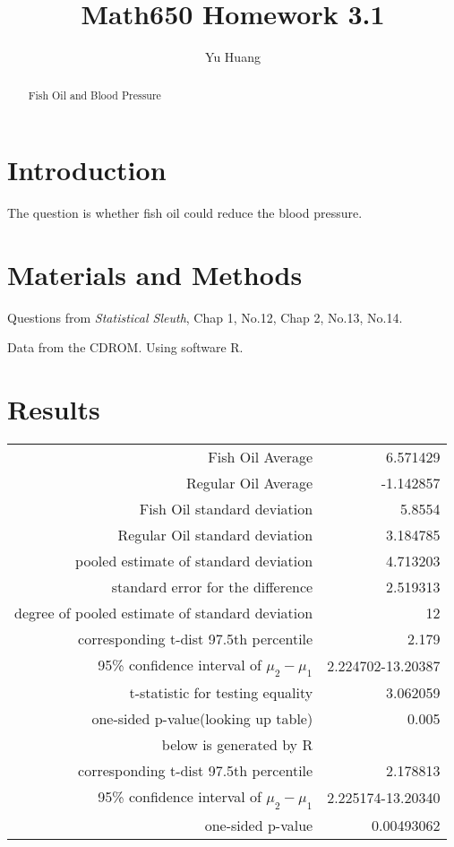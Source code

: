 \documentclass[a4paper,10pt]{article}
\title{Math650 Homework 3.1}
\author{Yu Huang}
\begin{document}
\maketitle

\begin{abstract}
Fish Oil and Blood Pressure
\end{abstract}

\section{Introduction}
The question is whether fish oil could reduce the blood pressure.

\section{Materials and Methods}
Questions from \emph{Statistical Sleuth}, Chap 1, No.12, Chap 2, No.13, No.14.

Data from the CDROM. Using software R.

\section{Results}

\begin{tabular}{|r|r|}
\hline
Fish Oil Average&6.571429\\
Regular Oil Average&-1.142857\\
Fish Oil standard deviation&5.8554\\
Regular Oil standard deviation&3.184785\\
pooled estimate of standard deviation&4.713203\\
standard error for the difference&2.519313\\
degree of pooled estimate of standard deviation&12\\
corresponding t-dist 97.5th percentile&2.179\\
95\% confidence interval of $\mu_2 - \mu_1$ & 2.224702-13.20387\\
t-statistic for testing equality & 3.062059\\
one-sided p-value(looking up table) & 0.005\\
\hline
below is generated by R&\\
\hline
corresponding t-dist 97.5th percentile&2.178813\\
95\% confidence interval of $\mu_2 - \mu_1$ & 2.225174-13.20340\\
one-sided p-value & 0.00493062\\
\hline
\end{tabular}
\end{document}
